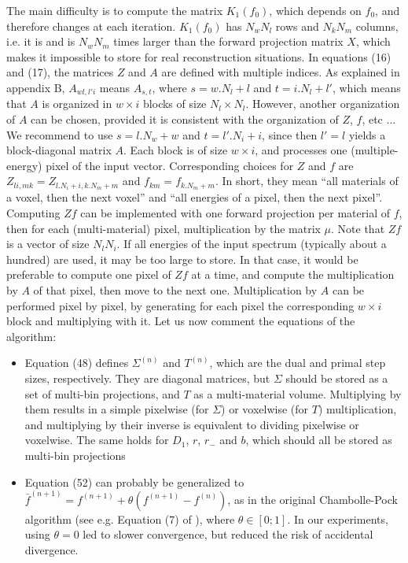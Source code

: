 \documentclass[a4paper, 10pt]{article}
\begin{document}
The main difficulty is to compute the matrix $K_1(f_0)$, which depends on $f_0$, and therefore changes at each iteration. $K_1(f_0)$ has $N_w N_l$ rows and $N_k N_m$ columns,
i.e. it is and is $N_w N_m$ times larger than the forward projection matrix $X$, which makes it impossible to store for real reconstruction situations. 
In equations (16) and (17), the matrices $Z$ and $A$ are defined with multiple indices. As explained in appendix B, $A_{wl,l'i}$ means 
$A_{s,t}$, where $s=w.N_l + l$ and $t=i.N_l + l'$, which means that $A$ is organized in $w \times i$ blocks of size $N_l \times N_l$.
However, another organization of $A$ can be chosen, provided it is consistent with the organization of $Z$, $f$, etc ...
We recommend to use $s=l.N_w+w$ and $t=l'.N_i+i$, since then $l'=l$ yields a block-diagonal matrix $A$. Each block is of size $w \times i$, 
and processes one (multiple-energy) pixel of the input vector.
Corresponding choices for $Z$ and $f$ are $Z_{li,mk} = Z_{l.N_i+i, k.N_m+m}$ and $f_{km} = f_{k.N_m+m}$. In short, they mean ``all materials of a voxel, then the next voxel''
and ``all energies of a pixel, then the next pixel''.
Computing $Zf$ can be implemented with one forward projection per material of $f$, then for each (multi-material) pixel, multiplication by the matrix $\mu$. 
Note that $Zf$ is a vector of size $N_lN_i$. If all energies of the input spectrum (typically about a hundred) are used, it may be too large to store. 
In that case, it would be preferable to compute one pixel of $Zf$ at a time, and compute the multiplication by $A$ of that pixel, then move to the next one.
Multiplication by $A$ can be performed pixel by pixel, by generating for each pixel the corresponding $w \times i$ block and multiplying with it.
Let us now comment the equations of the algorithm:
\begin{itemize}
 \item Equation (48) defines $\Sigma^{(n)}$ and $T^{(n)}$, which are the dual and primal step sizes, respectively. They are diagonal matrices, 
 but $\Sigma$ should be stored as a set of multi-bin projections, and $T$ as a multi-material volume. Multiplying by them results in a simple pixelwise (for $\Sigma$) or voxelwise (for $T$) multiplication,
 and multiplying by their inverse is equivalent to dividing pixelwise or voxelwise. The same holds for $D_1$, $r$, $r_{-}$ and $b$, which should all be
 stored as multi-bin projections
 \item Equation (52) can probably be generalized to $\bar{f}^{(n+1)} = f^{(n+1)} + \theta \left( f^{(n+1)} - f^{(n)} \right)$, as in the original 
 Chambolle-Pock algorithm (see e.g. Equation (7) of \cite{chambolle_first-order_2011}),
 where $\theta \in [0;1]$. In our experiments, using $\theta = 0$ led to slower convergence, but reduced the risk of accidental divergence.
\end{itemize}




\end{document}
